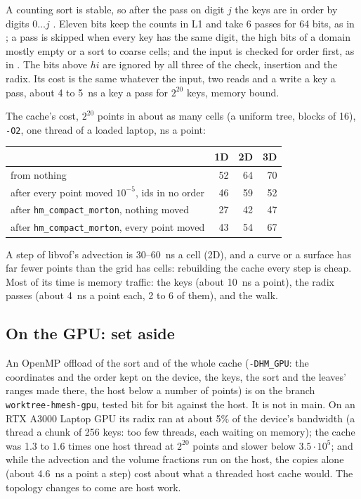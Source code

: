 \documentclass[10pt,a4paper]{article}
\theoremstyle{definition}
\newcommand{\fn}[1]{\texttt{#1}}
\begin{document}
A counting sort is stable, so after the pass on digit $j$ the keys are in
order by digits $0 \ldots j$ \cite[5.2.5]{knuth}. Eleven bits keep the
counts in L1 and take 6 passes for 64 bits, as in \cite{herf}; a pass is
skipped when every key has the same digit, the high bits of a domain mostly
empty or a sort to coarse cells; and the input is checked for order first,
as in \cite{terdiman}. The bits above $hi$ are ignored by all three of the
check, insertion and the radix. Its cost is the same whatever the input,
two reads and a write a key a pass, about 4 to 5~ns a key a pass for $2^{20}$
keys, memory bound.

The cache's cost, $2^{20}$ points in about as many cells (a uniform tree,
blocks of 16), \fn{-O2}, one thread of a loaded laptop, ns a point:

\begin{center}
\begin{tabular}{@{}lrrr@{}}
  \toprule
  & 1D & 2D & 3D \\
  \midrule
  from nothing & 52 & 64 & 70 \\
  after every point moved $10^{-5}$, ids in no order & 46 & 59 & 52 \\
  after \fn{hm\_compact\_morton}, nothing moved & 27 & 42 & 47 \\
  after \fn{hm\_compact\_morton}, every point moved & 43 & 54 & 67 \\
  \bottomrule
\end{tabular}
\end{center}

A step of libvof's advection is 30--60~ns a cell (2D), and a curve or a
surface has far fewer points than the grid has cells: rebuilding the cache
every step is cheap. Most of its time is memory traffic: the keys (about
10~ns a point), the radix passes (about 4~ns a point each, 2 to 6 of them),
and the walk.

\subsection{On the GPU: set aside}

An OpenMP offload of the sort and of the whole cache (\fn{-DHM\_GPU}: the
coordinates and the order kept on the device, the keys, the sort and the
leaves' ranges made there, the host below a number of points) is on the
branch \fn{worktree-hmesh-gpu}, tested bit for bit against the host. It is
not in main. On an RTX A3000 Laptop GPU its radix ran at about 5\% of the
device's bandwidth (a thread a chunk of 256 keys: too few threads, each
waiting on memory); the cache was 1.3 to 1.6 times one host thread at
$2^{20}$ points and slower below $3.5 \cdot 10^5$; and while the advection
and the volume fractions run on the host, the copies alone (about 4.6~ns a
point a step) cost about what a threaded host cache would. The topology
changes to come are host work.
\end{document}

